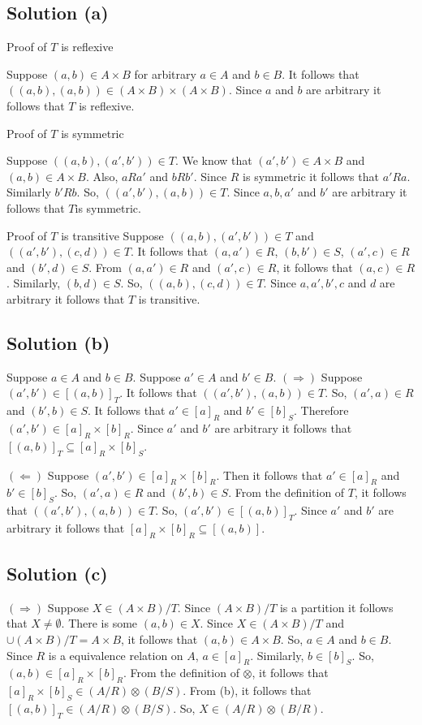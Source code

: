\documentclass{article}
\begin{document}
\subsection{Solution (a)}
Proof of $T$ is reflexive

Suppose $(a,b) \in A \times B$ for arbitrary $a \in A$ and $b \in B$.
It follows that $((a,b), (a,b)) \in (A \times B) \times (A \times B)$.
Since $a$ and $b$ are arbitrary it follows that $T$ is reflexive.

\noindent
Proof of $T$ is symmetric

Suppose $((a,b), (a',b')) \in T$. We know that $(a',b') \in A \times
B$ and $(a,b) \in A \times B$. Also, $aRa'$ and $bRb'$. Since $R$ is
symmetric it follows that $a'Ra$. Similarly $b'Rb$. So,
$((a',b'),(a,b)) \in T$. Since $a,b,a'$ and $b'$ are arbitrary it
follows that $T$is symmetric.

\noindent
Proof of $T$ is transitive Suppose $((a,b),(a',b')) \in T$ and
$((a',b'),(c,d)) \in T$. It follows that $(a,a') \in R$,
$(b,b') \in S$, $(a',c) \in R$ and $(b',d) \in S$. From $(a,a') \in R$
and $(a',c) \in R$, it follows that $(a,c) \in R$. Similarly,
$(b,d) \in S$. So, $((a,b),(c,d)) \in T$. Since $a,a',b',c$ and $d$
are arbitrary it follows that $T$ is transitive.

\subsection{Solution (b)}
Suppose $a \in A$ and $b \in B$. Suppose $a' \in A$ and $b' \in B$.
$(\Rightarrow)$ Suppose $(a',b') \in [(a,b)]_T$. It follows that
$((a',b'),(a,b)) \in T$. So, $(a',a) \in R$ and $(b',b) \in S$. It
follows that $a' \in [a]_R$ and $b' \in [b]_S$. Therefore $(a',b') \in
[a]_R \times [b]_R$. Since $a'$ and $b'$ are arbitrary it follows that
$[(a,b)]_T \subseteq [a]_R \times [b]_S$.

$(\Leftarrow)$ Suppose $(a',b') \in [a]_R \times [b]_R$. Then it
follows that $a' \in [a]_R$ and $b' \in [b]_S$. So, $(a',a) \in R$ and
$(b',b) \in S$. From the definition of $T$, it follows that
$((a',b'),(a,b)) \in T$. So, $(a',b') \in [(a,b)]_T$. Since $a'$ and
$b'$ are arbitrary it follows that
$[a]_R \times [b]_R \subseteq [(a,b)]$.

\subsection{Solution (c)}
$(\Rightarrow)$ Suppose $X \in (A \times B)/T$. Since $(A \times B)/T$
is a partition it follows that $X \neq \emptyset$. There is some
$(a,b) \in X$. Since $X \in (A \times B)/T$ and $\cup (A \times B)/T =
A \times B$, it follows that $(a,b) \in A \times B$. So, $a \in A$ and
$b \in B$. Since $R$ is a equivalence relation on $A$, $a \in [a]_R$.
Similarly, $b \in [b]_S$. So, $(a,b) \in [a]_R \times [b]_R$. From the
definition of $\otimes$, it follows that $[a]_R \times [b]_S \in (A/R)
\otimes (B/S)$. From (b), it follows that $[(a,b)]_T \in (A/R) \otimes
(B/S)$. So, $X \in (A/R) \otimes (B/R)$.
\end{document}
